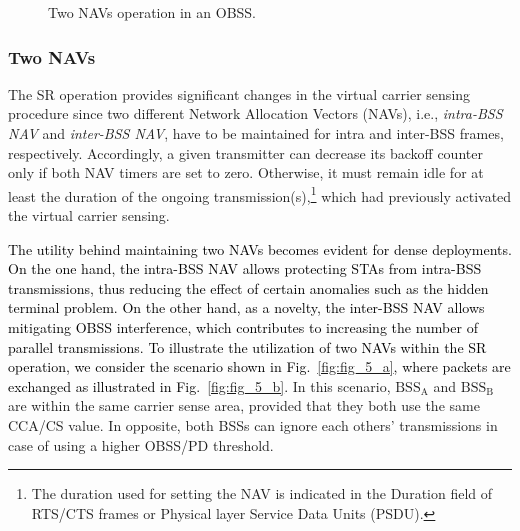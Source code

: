 \documentclass[preprint,12pt]{elsarticle}
\begin{document}
\begin{figure}[ht!]
	\centering
	\hspace{1cm}
	\caption{Two NAVs operation in an OBSS.}
	\label{fig:two_navs}
\end{figure}
\subsubsection{Two NAVs}
\label{section:two_navs}
The SR operation provides significant changes in the virtual carrier sensing procedure since two different Network Allocation Vectors (NAVs), i.e., \emph{intra-BSS NAV} and \emph{inter-BSS NAV}, have to be maintained for intra and inter-BSS frames, respectively. Accordingly, a given transmitter can decrease its backoff counter only if both NAV timers are set to zero. Otherwise, it must remain idle for at least the duration of the ongoing transmission(s),\footnote{The duration used for setting the NAV is indicated in the Duration field of RTS/CTS frames or Physical layer Service Data Units (PSDU).} which had previously activated the virtual carrier sensing. 

\textcolor{black}{The utility behind maintaining two NAVs becomes evident for dense deployments. On the one hand, the intra-BSS NAV allows protecting STAs from intra-BSS transmissions, thus reducing the effect of certain anomalies such as the hidden terminal problem. On the other hand, as a novelty, the inter-BSS NAV allows mitigating OBSS interference, which contributes to increasing the number of parallel transmissions. To illustrate the utilization of two NAVs within the SR operation, we consider the scenario shown in Fig.~\ref{fig:fig_5_a}, where packets are exchanged as illustrated in Fig.~\ref{fig:fig_5_b}.} In this scenario, $\text{BSS}_\text{A}$ and $\text{BSS}_\text{B}$ are within the same carrier sense area, provided that they both use the same CCA/CS value. In opposite, both BSSs can ignore each others' transmissions in case of using a higher OBSS/PD threshold.
\end{document}
